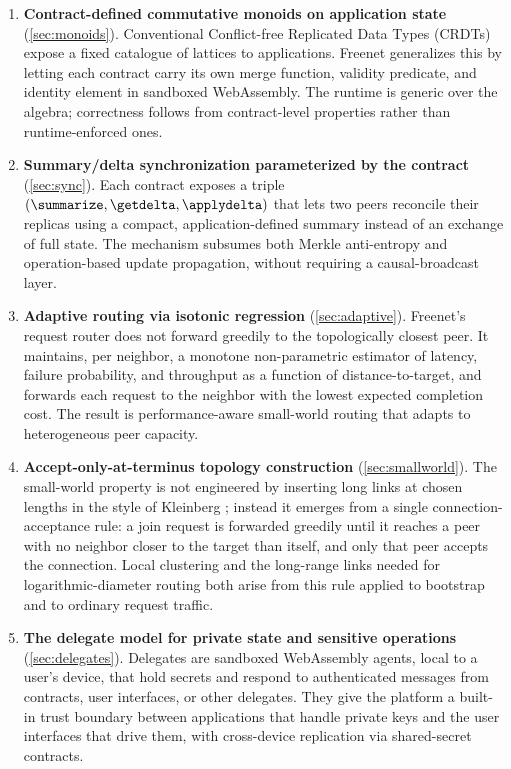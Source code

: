 \begin{enumerate}[leftmargin=1.4em, itemsep=2pt]
  \item \textbf{Contract-defined commutative monoids on application state} (\cref{sec:monoids}). Conventional Conflict-free Replicated Data Types (CRDTs) \citep{shapiro2011crdt} expose a fixed catalogue of lattices to applications. Freenet generalizes this by letting each contract carry its own merge function, validity predicate, and identity element in sandboxed WebAssembly. The runtime is generic over the algebra; correctness follows from contract-level properties rather than runtime-enforced ones.

  \item \textbf{Summary/delta synchronization parameterized by the contract} (\cref{sec:sync}). Each contract exposes a triple $(\summarize, \getdelta, \applydelta)$ that lets two peers reconcile their replicas using a compact, application-defined summary instead of an exchange of full state. The mechanism subsumes both Merkle anti-entropy and operation-based update propagation, without requiring a causal-broadcast layer.

  \item \textbf{Adaptive routing via isotonic regression} (\cref{sec:adaptive}). Freenet's request router does not forward greedily to the topologically closest peer. It maintains, per neighbor, a monotone non-parametric estimator of latency, failure probability, and throughput as a function of distance-to-target, and forwards each request to the neighbor with the lowest expected completion cost. The result is performance-aware small-world routing that adapts to heterogeneous peer capacity.

  \item \textbf{Accept-only-at-terminus topology construction} (\cref{sec:smallworld}). The small-world property is not engineered by inserting long links at chosen lengths in the style of Kleinberg \citep{kleinberg2000small}; instead it emerges from a single connection-acceptance rule: a join request is forwarded greedily until it reaches a peer with no neighbor closer to the target than itself, and only that peer accepts the connection. Local clustering and the long-range links needed for logarithmic-diameter routing both arise from this rule applied to bootstrap and to ordinary request traffic.

  \item \textbf{The delegate model for private state and sensitive operations} (\cref{sec:delegates}). Delegates are sandboxed WebAssembly agents, local to a user's device, that hold secrets and respond to authenticated messages from contracts, user interfaces, or other delegates. They give the platform a built-in trust boundary between applications that handle private keys and the user interfaces that drive them, with cross-device replication via shared-secret contracts.
\end{enumerate}


